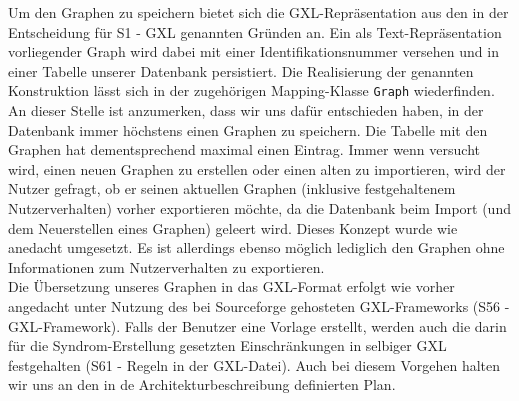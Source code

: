 \documentclass[enabledeprecatedfontcommands,fontsize=11pt,paper=a4,twoside]{scrartcl}
\newcounter{one}
\begin{document}
Um den Graphen zu speichern bietet sich die GXL-Repräsentation aus den in der Entscheidung für S1 - GXL genannten Gründen an. Ein als Text-Repräsentation vorliegender Graph wird dabei mit einer Identifikationsnummer versehen und in einer Tabelle unserer Datenbank persistiert. Die Realisierung der genannten Konstruktion lässt sich in der zugehörigen Mapping-Klasse \texttt{Graph} wiederfinden.  An dieser Stelle ist anzumerken, dass wir uns dafür entschieden haben, in der Datenbank immer höchstens einen Graphen zu speichern. Die Tabelle mit den Graphen hat dementsprechend maximal einen Eintrag. Immer wenn versucht wird, einen neuen Graphen zu erstellen oder einen alten zu importieren, wird der Nutzer gefragt, ob er seinen aktuellen Graphen (inklusive festgehaltenem Nutzerverhalten) vorher exportieren möchte, da die Datenbank beim Import (und dem Neuerstellen eines Graphen) geleert wird. Dieses Konzept wurde wie anedacht umgesetzt. Es ist allerdings ebenso möglich lediglich den Graphen ohne Informationen zum Nutzerverhalten zu exportieren.\\
Die Übersetzung unseres Graphen in das GXL-Format erfolgt wie vorher angedacht unter Nutzung des bei Sourceforge gehosteten GXL-Frameworks (S56 - GXL-Framework). Falls der Benutzer eine Vorlage erstellt, werden auch die darin für die Syndrom-Erstellung gesetzten Einschränkungen in selbiger GXL festgehalten (S61 - Regeln in der GXL-Datei). Auch bei diesem Vorgehen halten wir uns an den in de Architekturbeschreibung definierten Plan.\\ 
\end{document}
